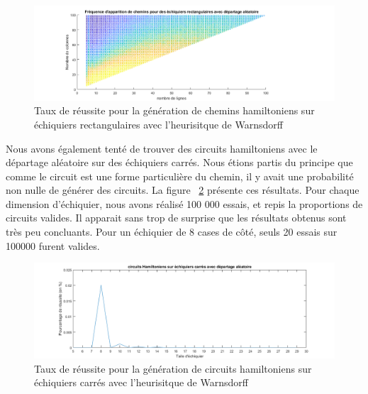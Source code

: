 \begin{figure}[h]
\begin{center}
   \includegraphics[scale=0.6]{img/WarnsdorffTauxReussiteRectangle.png} 
   \caption{\label{WanrsdorffRectangleReussite} Taux de réussite pour la génération de chemins hamiltoniens sur échiquiers rectangulaires avec l'heurisitque de Warnsdorff}
   \end{center}
\end{figure}

Nous avons également tenté de trouver des circuits hamiltoniens avec le départage aléatoire sur des échiquiers carrés. Nous étions partis du principe que comme le circuit est une forme particulière du chemin, il y avait une probabilité non nulle de générer des circuits. La figure ~\ref{CircuitCarre} présente ces résultats. Pour chaque dimension d'échiquier, nous avons réalisé 100 000 essais, et repis la proportions de circuits valides. Il apparait sans trop de surprise que les résultats obtenus sont très peu concluants. Pour un échiquier de 8 cases de côté, seuls 20 essais sur 100000 furent valides. 

\begin{figure}[h]
\begin{center}
   \includegraphics[scale=0.6]{img/circuitCarre.png} 
   \caption{\label{CircuitCarre} Taux de réussite pour la génération de circuits hamiltoniens sur échiquiers carrés avec l'heurisitque de Warnsdorff}
   \end{center}
\end{figure}

